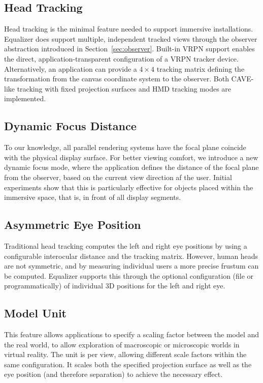 \documentclass[10pt,journal,compsoc]{IEEEtran}
\newcommand{\sref}[1]{Section~\ref{#1}}
\begin{document}
\subsection{Head Tracking}

Head tracking is the minimal feature needed to support immersive
installations. Equalizer does support multiple, independent tracked views
through the observer abstraction introduced in \sref{sec:observer}. Built-in
VRPN support enables the direct, application-transparent configuration of a VRPN
tracker device. Alternatively, an application can provide a $4\times 4$ tracking
matrix defining the transformation from the canvas coordinate system to the
observer. Both CAVE-like tracking with fixed projection surfaces and HMD
tracking modes are implemented.

\subsection{Dynamic Focus Distance}

To our knowledge, all parallel rendering systems have the focal plane coincide
with the physical display surface. For better viewing comfort, we introduce a
new dynamic focus mode, where the application defines the distance of the focal
plane from the observer, based on the current view direction af the
user. Initial experiments show that this is particularly effective for objects
placed within the immersive space, that is, in front of all display segments.

\subsection{Asymmetric Eye Position}

Traditional head tracking computes the left and right eye positions by using a
configurable interocular distance and the tracking matrix. However, human heads
are not symmetric, and by measuring individual users a more precise frustum can
be computed. Equalizer supports this through the optional configuration (file or
programmatically) of individual 3D positions for the left and right eye.

\subsection{Model Unit}

This feature allows applications to specify a scaling factor between the model
and the real world, to allow exploration of macroscopic or microscopic worlds in
virtual reality. The unit is per view, allowing different scale factors within
the same configuration. It scales both the specified projection surface as well
as the eye position (and therefore separation) to achieve the necessary effect.
\end{document}

